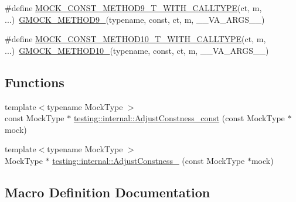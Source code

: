 \begin{DoxyCompactItemize}
\item 
\#define \mbox{\hyperlink{_obj__test_2lib_2googletest-master_2googlemock_2include_2gmock_2gmock-generated-function-mockers_8h_afb8878388e0875e109d1fd6902471780}{M\+O\+C\+K\+\_\+\+C\+O\+N\+S\+T\+\_\+\+M\+E\+T\+H\+O\+D9\+\_\+\+T\+\_\+\+W\+I\+T\+H\+\_\+\+C\+A\+L\+L\+T\+Y\+PE}}(ct,  m, ...)~\mbox{\hyperlink{_obj__test_2lib_2googletest-release-1_88_81_2googlemock_2include_2gmock_2gmock-generated-function-mockers_8h_aa820171a19cc587c247dbe05cbffc55f}{G\+M\+O\+C\+K\+\_\+\+M\+E\+T\+H\+O\+D9\+\_\+}}(typename, const, ct, m, \+\_\+\+\_\+\+V\+A\+\_\+\+A\+R\+G\+S\+\_\+\+\_\+)
\item 
\#define \mbox{\hyperlink{_obj__test_2lib_2googletest-master_2googlemock_2include_2gmock_2gmock-generated-function-mockers_8h_af697bae09aedcdfb3d6897081efe7541}{M\+O\+C\+K\+\_\+\+C\+O\+N\+S\+T\+\_\+\+M\+E\+T\+H\+O\+D10\+\_\+\+T\+\_\+\+W\+I\+T\+H\+\_\+\+C\+A\+L\+L\+T\+Y\+PE}}(ct,  m, ...)~\mbox{\hyperlink{_obj__test_2lib_2googletest-release-1_88_81_2googlemock_2include_2gmock_2gmock-generated-function-mockers_8h_a81a48223a8771de36ef92ac6d56f6e81}{G\+M\+O\+C\+K\+\_\+\+M\+E\+T\+H\+O\+D10\+\_\+}}(typename, const, ct, m, \+\_\+\+\_\+\+V\+A\+\_\+\+A\+R\+G\+S\+\_\+\+\_\+)
\end{DoxyCompactItemize}
\subsection*{Functions}
\begin{DoxyCompactItemize}
\item 
{\footnotesize template$<$typename Mock\+Type $>$ }\\const Mock\+Type $\ast$ \mbox{\hyperlink{namespacetesting_1_1internal_a758f640e990a927dc148d6b960c0704b}{testing\+::internal\+::\+Adjust\+Constness\+\_\+const}} (const Mock\+Type $\ast$mock)
\item 
{\footnotesize template$<$typename Mock\+Type $>$ }\\Mock\+Type $\ast$ \mbox{\hyperlink{namespacetesting_1_1internal_a5b32070bcc46f4021c80186e07bc3008}{testing\+::internal\+::\+Adjust\+Constness\+\_\+}} (const Mock\+Type $\ast$mock)
\end{DoxyCompactItemize}


\subsection{Macro Definition Documentation}
\mbox{\label{_obj__test_2lib_2googletest-master_2googlemock_2include_2gmock_2gmock-generated-function-mockers_8h_a887575cc1c31158fba808180a10c004f}} 
